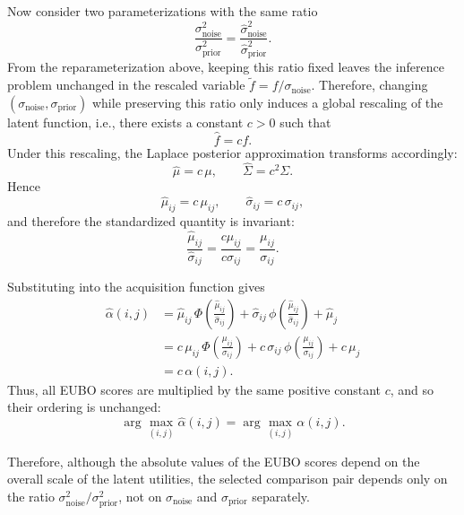 \documentclass{article}
\begin{document}
Now consider two parameterizations with the same ratio
\begin{equation*}
\frac{\sigma_{\text{noise}}^2}{\sigma_{\text{prior}}^2}
=
\frac{\hat{\sigma}_{\text{noise}}^2}{\hat{\sigma}_{\text{prior}}^2}.
\end{equation*}
From the reparameterization above, keeping this ratio fixed leaves the inference problem unchanged in the rescaled variable $\tilde f = f/\sigma_{\text{noise}}$. Therefore, changing $(\sigma_{\text{noise}},\sigma_{\text{prior}})$ while preserving this ratio only induces a global rescaling of the latent function, i.e., there exists a constant $c>0$ such that
\begin{equation*}
\hat{f} = c f .
\end{equation*}
Under this rescaling, the Laplace posterior approximation transforms accordingly:
\begin{equation*}
\hat{\mu} = c\,\mu,
\qquad
\hat{\Sigma} = c^2 \Sigma.
\end{equation*}
Hence
\begin{equation*}
\hat{\mu}_{ij} = c\,\mu_{ij},
\qquad
\hat{\sigma}_{ij} = c\,\sigma_{ij},
\end{equation*}
and therefore the standardized quantity is invariant:
\begin{equation*}
\frac{\hat{\mu}_{ij}}{\hat{\sigma}_{ij}}
=
\frac{c\mu_{ij}}{c\sigma_{ij}}
=
\frac{\mu_{ij}}{\sigma_{ij}}.
\end{equation*}

Substituting into the acquisition function gives
\begin{align*}
\hat{\alpha}(i,j)
&=
\hat{\mu}_{ij}\,\Phi\!\left(\frac{\hat{\mu}_{ij}}{\hat{\sigma}_{ij}}\right)
+
\hat{\sigma}_{ij}\,\phi\!\left(\frac{\hat{\mu}_{ij}}{\hat{\sigma}_{ij}}\right)
+
\hat{\mu}_j \\
&=
c\,\mu_{ij}\,\Phi\!\left(\frac{\mu_{ij}}{\sigma_{ij}}\right)
+
c\,\sigma_{ij}\,\phi\!\left(\frac{\mu_{ij}}{\sigma_{ij}}\right)
+
c\,\mu_j \\
&=
c\,\alpha(i,j).
\end{align*}
Thus, all EUBO scores are multiplied by the same positive constant $c$, and so their ordering is unchanged:
\begin{equation*}
\arg\max_{(i,j)} \hat{\alpha}(i,j)
=
\arg\max_{(i,j)} \alpha(i,j).
\end{equation*}

Therefore, although the absolute values of the EUBO scores depend on the overall scale of the latent utilities, the selected comparison pair depends only on the ratio $\sigma_{\text{noise}}^2/\sigma_{\text{prior}}^2$, not on $\sigma_{\text{noise}}$ and $\sigma_{\text{prior}}$ separately.
\end{document}
